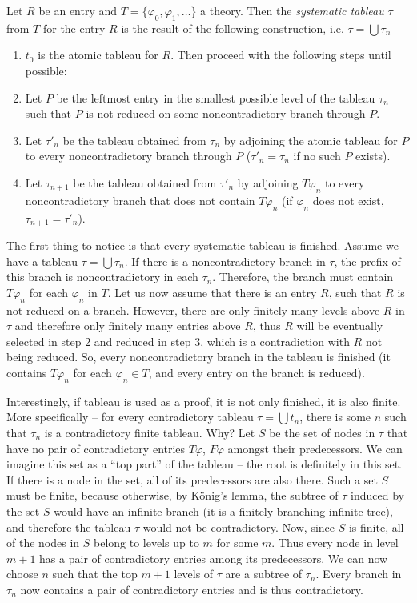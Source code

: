 \begin{definition}
Let $R$ be an entry and $T = \{\varphi_0, \varphi_1, \dots\}$ a theory. Then the \emph{systematic tableau} $\tau$ from $T$ for the entry $R$ is the result of the following construction, i.e. $\tau = \bigcup \tau_n$
\begin{enumerate}
	\item $t_0$ is the atomic tableau for $R$. Then proceed with the following steps until possible:
	\item Let $P$ be the leftmost entry in the smallest possible level of the tableau $\tau_n$ such that $P$ is not reduced on some noncontradictory branch through $P$.
	\item Let $\tau'_n$ be the tableau obtained from $\tau_n$ by adjoining the atomic tableau for $P$ to every noncontradictory branch through $P$ ($\tau'_n = \tau_n$ if no such $P$ exists).
	\item Let $\tau_{n+1}$ be the tableau obtained from $\tau'_n$ by adjoining $T \varphi_n$ to every noncontradictory branch that does not contain $T \varphi_n$ (if $\varphi_n$ does not exist, $\tau_{n+1}=\tau'_n$).
\end{enumerate}
\end{definition}

The first thing to notice is that every systematic tableau is finished. Assume we have a tableau $\tau = \bigcup \tau_n$. If there is a noncontradictory branch in $\tau$, the prefix of this branch is noncontradictory in each $\tau_n$. Therefore, the branch must contain $T \varphi_n$ for each $\varphi_n$ in $T$. Let us now assume that there is an entry $R$, such that $R$ is not reduced on a branch. However, there are only finitely many levels above $R$ in $\tau$ and therefore only finitely many entries above $R$, thus $R$ will be eventually selected in step 2 and reduced in step 3, which is a contradiction with $R$ not being reduced. So, every noncontradictory branch in the tableau is finished (it contains $T \varphi_n$ for each $\varphi_n \in T$, and every entry on the branch is reduced).

Interestingly, if tableau is used as a proof, it is not only finished, it is also finite. More specifically -- for every contradictory tableau $\tau = \bigcup t_n$, there is some $n$ such that $\tau_n$ is a contradictory finite tableau. Why? Let $S$ be the set of nodes in $\tau$ that have no pair of contradictory entries $T \varphi$, $F \varphi$ amongst their predecessors. We can imagine this set as a ``top part'' of the tableau -- the root is definitely in this set. If there is a node in the set, all of its predecessors are also there. Such a set $S$ must be finite, because otherwise, by König's lemma, the subtree of $\tau$ induced by the set $S$ would have an infinite branch (it is a finitely branching infinite tree), and therefore the tableau $\tau$ would not be contradictory. Now, since $S$ is finite, all of the nodes in $S$ belong to levels up to $m$ for some $m$. Thus every node in level $m+1$ has a pair of contradictory entries among its predecessors. We can now choose $n$ such that the top $m+1$ levels of $\tau$ are a subtree of $\tau_n$. Every branch in $\tau_n$ now contains a pair of contradictory entries and is thus contradictory.

